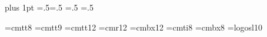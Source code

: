 %



\pdffalse \dvipdffalse        %
\parskip=0pt plus 1pt
\parindent=18pt
\abovedisplayskip=.5\abovedisplayskip  \belowdisplayskip=.5\belowdisplayskip
\abovedisplayshortskip=.5\abovedisplayshortskip
\belowdisplayshortskip=.5\belowdisplayshortskip

\font\eighttt=cmtt8
\font\ninett=cmtt9
\font\twelvett=cmtt12
\font\authorfont=cmr12
\font\sectionfont=cmbx12
\font\eightit=cmti8
\font\eightbf=cmbx8
\font\logosl=logosl10 %
\def\slMF{{\logosl META}\-{\logosl FONT}}

\def\cw#1{{\tt #1}}
\def\bs{\char92 }                              %
\def\lb{\char123 }\def\rb{\char125 }           %

\def\chapter#1{\penalty-500\bigskip
  \centerline{\sectionfont\def\.##1{{\twelvett##1}}#1}\nobreak\vskip 6pt}
\def\section#1{\medskip\noindent{\bf #1.}\enspace\ignorespaces}

\def\bull{\smallskip\item{$\bullet$}}

